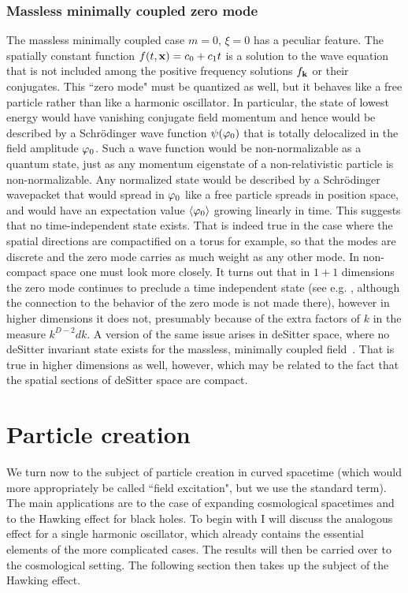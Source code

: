 \documentclass[12pt]{article}
\newcommand{\sect}[1]{\section{#1}\setcounter{equation}{0}}
\begin{document}
\subsubsection{Massless minimally coupled zero mode}
The massless minimally coupled
case $m=0$, $\xi=0$ has a peculiar feature. The
spatially constant function $f(t,{\bf x})=c_0 + c_1t$ is a
solution to the wave equation that is not included among the
positive frequency solutions $f_{\bf k}$ or their conjugates. 
This ``zero mode" must be quantized as well, but
it behaves like a free particle rather than like a harmonic
oscillator. In particular, the state of lowest energy would
have vanishing conjugate field momentum and hence would be
described by a Schr\"odinger wave function $\psi(\varphi_0)$
that is totally
delocalized in the field amplitude $\varphi_0$. Such a wave function would 
be non-normalizable as a quantum state, just as
any momentum eigenstate of a non-relativistic particle
is non-normalizable. Any normalized state would be described by a
Schr\"odinger wavepacket that would spread in $\varphi_0$
like a free particle spreads in position space, and would
have an expectation value $\langle\varphi_0\rangle$ growing linearly in time. 
This suggests 
that no time-independent state exists. That is indeed true in the
case where the spatial directions are compactified on a torus
for example, so that the modes are discrete and the zero mode
carries as much weight as any other mode. In non-compact
space one must look more closely. It turns out
that in
$1+1$ dimensions the zero mode continues to preclude a time
independent state (see e.g. \cite{Ford:1985qh}, although the
connection to the behavior of the zero mode is not made there), 
however in higher dimensions it does not,
presumably because of the extra factors of $k$ in the measure
$k^{D-2}dk$. A version of the same issue arises in deSitter
space, where no deSitter invariant state exists for the
massless, minimally coupled field~\cite{Allen:ux}. That is true in
higher dimensions as well, however, which may be related to the
fact that the spatial sections of deSitter space are compact.

\sect{Particle creation}
We turn now to the subject of particle creation in 
curved spacetime (which would more appropriately be 
called ``field excitation", but we use the standard term). 
The main applications
are to the case of expanding cosmological spacetimes and to 
the Hawking effect for black holes. To begin with I will discuss the
analogous effect for a single harmonic oscillator, which already contains 
the essential elements of the more complicated cases. The results will
then be carried over to the cosmological setting. The following 
section then takes up the subject of the Hawking effect.
\end{document}
